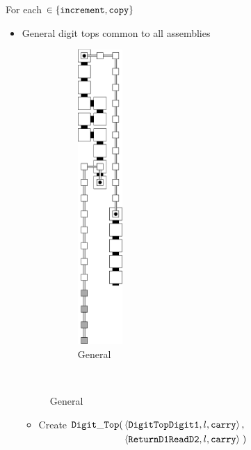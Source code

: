        For each {\inc} $\in \{ {\tt increment, copy } \}$
        \begin{itemize}
            \item General digit tops common to all assemblies

            \begin{figure}[H]
                \centering
                \begin{subfigure}[t]{0.2\textwidth}
                    \centering
                    \includegraphics[width=0.2\textwidth]{digit_tops/digit_top_general}
                    \caption{\label{fig:digit_tops/digit_top_general} General }
                \end{subfigure}%
                ~
            \end{figure}

            \begin{itemize}
                \item Create
                $\begin{aligned}[t]
                    {\tt Digit\_Top}(& \left \langle {\tt DigitTopDigit1}, l, {\tt carry} \right\rangle, & \\
                          & \left \langle {\tt ReturnD1ReadD2}, l,  {\tt carry} \right\rangle \;)
                \end{aligned}$
                \vspace{.5cm}


\end{itemize}
\end{itemize}
